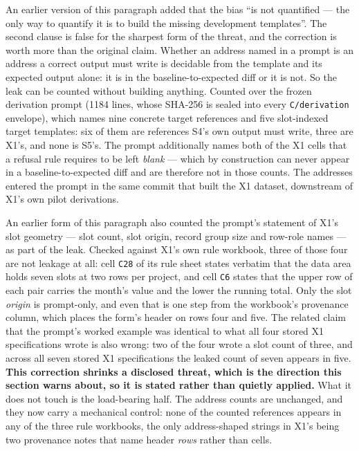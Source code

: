 An earlier version of this paragraph added that the bias ``is not quantified --- the only way
to quantify it is to build the missing development templates''. The second clause is false for
the sharpest form of the threat, and the correction is worth more than the original claim. Whether
an address named in a prompt is an address a correct output must write is decidable from the
template and its expected output alone: it is in the baseline-to-expected diff or it is not. So
the leak can be counted without building anything. Counted over the frozen derivation prompt
(1184 lines, whose SHA-256 is sealed into every \texttt{C/derivation} envelope), which names
nine concrete target references and five slot-indexed target templates: six of them are
references S4's own output must write, three are X1's, and none is S5's. The prompt additionally
names both of the X1 cells that a refusal rule requires to be left \emph{blank} --- which by
construction can never appear in a baseline-to-expected diff and are therefore not in those
counts. The addresses entered the prompt in the same commit that built the X1 dataset,
downstream of X1's own pilot derivations.

An earlier form of this paragraph also counted the prompt's statement of X1's slot geometry
--- slot count, slot origin, record group size and row-role names --- as part of the leak.
Checked against X1's own rule workbook, three of those four are not leakage at all: cell
\texttt{C28} of its rule sheet states verbatim that the data area holds seven slots at two rows
per project, and cell \texttt{C6} states that the upper row of each pair carries the month's
value and the lower the running total. Only the slot \emph{origin} is prompt-only, and even
that is one step from the workbook's provenance column, which places the form's header on rows
four and five. The related claim that the prompt's worked example was identical to what all four
stored X1 specifications wrote is also wrong: two of the four wrote a slot count of three, and
across all seven stored X1 specifications the leaked count of seven appears in five.
\textbf{This correction shrinks a disclosed threat, which is the direction this section warns
about, so it is stated rather than quietly applied.} What it does not touch is the load-bearing
half. The address counts are unchanged, and they now carry a mechanical control: none of the
counted references appears in any of the three rule workbooks, the only address-shaped strings
in X1's being two provenance notes that name header \emph{rows} rather than cells.

